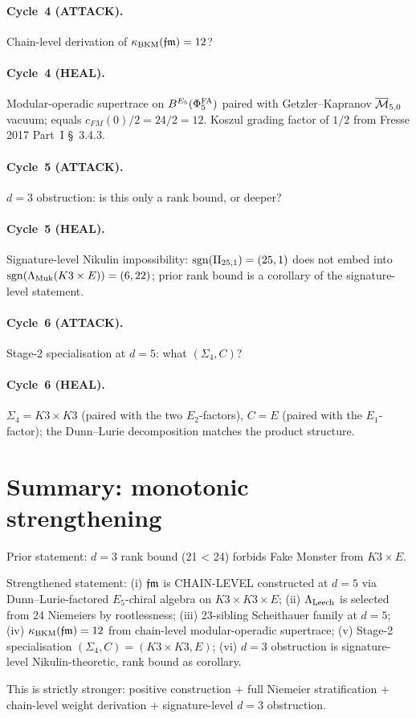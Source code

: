 \paragraph{Cycle~4 (ATTACK).} Chain-level derivation of $\kappa_{\mathrm{BKM}}(\mathfrak{fm})
= 12$?

\paragraph{Cycle~4 (HEAL).} Modular-operadic supertrace on
$B^{E_5}(\Phi^{\mathrm{FA}}_5)$ paired with Getzler--Kapranov
$\overline{\mathcal M}_{5, 0}$ vacuum; equals $c_{FM}(0)/2 = 24/2 = 12$.
Koszul grading factor of $1/2$ from Fresse 2017 Part~I \S~3.4.3.

\paragraph{Cycle~5 (ATTACK).} $d = 3$ obstruction: is this only a
rank bound, or deeper?

\paragraph{Cycle~5 (HEAL).} Signature-level Nikulin impossibility:
$\mathrm{sgn}(\mathrm{II}_{25,1}) = (25, 1)$ does not embed into
$\mathrm{sgn}(\Lambda_{\mathrm{Muk}}(K3 \times E)) = (6, 22)$; prior rank
bound is a corollary of the signature-level statement.

\paragraph{Cycle~6 (ATTACK).} Stage-2 specialisation at $d = 5$: what
$(\Sigma_4, C)$?

\paragraph{Cycle~6 (HEAL).} $\Sigma_4 = K3 \times K3$ (paired with
the two $E_2$-factors), $C = E$ (paired with the $E_1$-factor); the
Dunn--Lurie decomposition matches the product structure.

\section*{Summary: monotonic strengthening}

Prior statement: $d = 3$ rank bound (21 < 24) forbids Fake Monster
from $K3 \times E$.

Strengthened statement: (i) $\mathfrak{fm}$ is CHAIN-LEVEL constructed at $d = 5$
via Dunn--Lurie-factored $E_5$-chiral algebra on
$K3 \times K3 \times E$; (ii) $\Lambda_{\mathrm{Leech}}$ is selected from 24 Niemeiers
by rootlessness; (iii) 23-sibling Scheithauer family at $d = 5$;
(iv) $\kappa_{\mathrm{BKM}}(\mathfrak{fm}) = 12$ from chain-level modular-operadic
supertrace; (v) Stage-2 specialisation
$(\Sigma_4, C) = (K3 \times K3, E)$; (vi) $d = 3$ obstruction is
signature-level Nikulin-theoretic, rank bound as corollary.

This is strictly stronger: positive construction + full Niemeier
stratification + chain-level weight derivation + signature-level
$d = 3$ obstruction.

